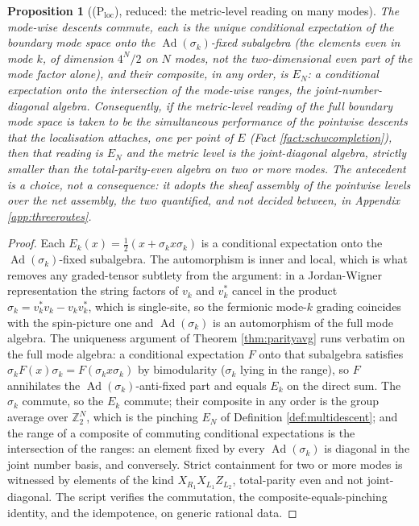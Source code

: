 \documentclass[11pt]{article}
\newtheorem{proposition}[theorem]{Proposition}
\theoremstyle{definition}
\newcommand{\EN}{E_{N}}
\begin{document}
\begin{proposition}[(P$_{\mathrm{loc}}$), reduced: the metric-level reading on many modes]\label{prem:localuniv}
The mode-wise descents commute, each is the unique conditional expectation of the boundary mode space onto the $\operatorname{Ad}(\sigma_k)$-fixed subalgebra (the elements even in mode $k$, of dimension $4^{N}/2$ on $N$ modes, not the two-dimensional even part of the mode factor alone), and their composite, in any order, is $\EN$: a conditional expectation onto the intersection of the mode-wise ranges, the joint-number-diagonal algebra. Consequently, if the metric-level reading of the full boundary mode space is taken to be the simultaneous performance of the pointwise descents that the localisation attaches, one per point of $E$ (Fact \ref{fact:schwcompletion}), then that reading is $\EN$ and the metric level is the joint-diagonal algebra, strictly smaller than the total-parity-even algebra on two or more modes. The antecedent is a \emph{choice}, not a consequence: it adopts the sheaf assembly of the pointwise levels over the net assembly, the two quantified, and not decided between, in Appendix \ref{app:threeroutes}.
\end{proposition}

\begin{proof}
Each $E_k(x) = \tfrac12(x + \sigma_k x \sigma_k)$ is a conditional expectation onto the $\operatorname{Ad}(\sigma_k)$-fixed subalgebra. The automorphism is inner and local, which is what removes any graded-tensor subtlety from the argument: in a Jordan-Wigner representation the string factors of $v_k$ and $v_k^{*}$ cancel in the product $\sigma_k = v_k^{*}v_k - v_k v_k^{*}$, which is single-site, so the fermionic mode-$k$ grading coincides with the spin-picture one and $\operatorname{Ad}(\sigma_k)$ is an automorphism of the full mode algebra. The uniqueness argument of Theorem \ref{thm:parityavg} runs verbatim on the full mode algebra: a conditional expectation $F$ onto that subalgebra satisfies $\sigma_k F(x)\sigma_k = F(\sigma_k x \sigma_k)$ by bimodularity ($\sigma_k$ lying in the range), so $F$ annihilates the $\operatorname{Ad}(\sigma_k)$-anti-fixed part and equals $E_k$ on the direct sum. The $\sigma_k$ commute, so the $E_k$ commute; their composite in any order is the group average over $\mathbb{Z}_2^{N}$, which is the pinching $\EN$ of Definition \ref{def:multidescent}; and the range of a composite of commuting conditional expectations is the intersection of the ranges: an element fixed by every $\operatorname{Ad}(\sigma_k)$ is diagonal in the joint number basis, and conversely. Strict containment for two or more modes is witnessed by elements of the kind $X_{R_1}X_{L_1}Z_{L_2}$, total-parity even and not joint-diagonal. The script verifies the commutation, the composite-equals-pinching identity, and the idempotence, on generic rational data.
\end{proof}
\end{document}

